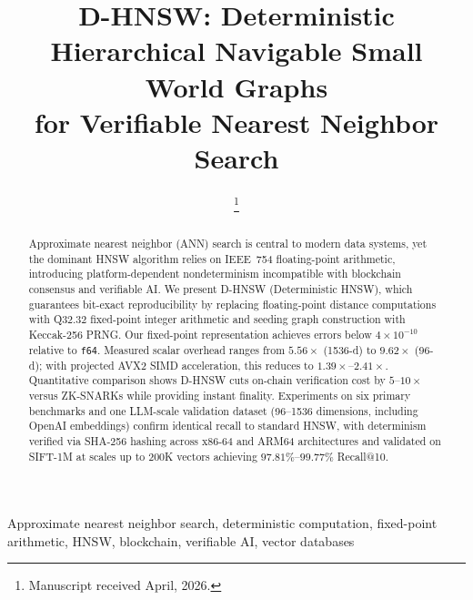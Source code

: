 \documentclass[10pt,journal]{IEEEtran}
\newcommand{\dhnsw}{\textsc{D-HNSW}}
\begin{document}
\title{D-HNSW: Deterministic Hierarchical Navigable Small World Graphs\\for Verifiable Nearest Neighbor Search}

\author{
  \thanks{Manuscript received April, 2026.}
}

\maketitle

\begin{abstract}
Approximate nearest neighbor (ANN) search is central to modern data systems, yet the dominant HNSW algorithm relies on IEEE~754 floating-point arithmetic, introducing platform-dependent nondeterminism incompatible with blockchain consensus and verifiable AI. We present \dhnsw{} (Deterministic HNSW), which guarantees bit-exact reproducibility by replacing floating-point distance computations with Q32.32 fixed-point integer arithmetic and seeding graph construction with Keccak-256 PRNG. Our fixed-point representation achieves errors below $4 \times 10^{-10}$ relative to \texttt{f64}. Measured scalar overhead ranges from $5.56\times$ (1536-d) to $9.62\times$ (96-d); with projected AVX2 SIMD acceleration, this reduces to $1.39\times$--$2.41\times$. Quantitative comparison shows \dhnsw{} cuts on-chain verification cost by $5$--$10\times$ versus ZK-SNARKs while providing instant finality. Experiments on six primary benchmarks and one LLM-scale validation dataset (96--1536 dimensions, including OpenAI embeddings) confirm identical recall to standard HNSW, with determinism verified via SHA-256 hashing across x86-64 and ARM64 architectures and validated on SIFT-1M at scales up to 200K vectors achieving $97.81\%$--$99.77\%$ Recall@10.
\end{abstract}

\begin{IEEEkeywords}
Approximate nearest neighbor search, deterministic computation, fixed-point arithmetic, HNSW, blockchain, verifiable AI, vector databases
\end{IEEEkeywords}


\end{document}
